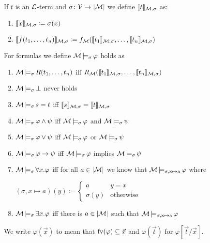 \begin{boxdef}
\begin{defi}
    If $t$ is an $\mathcal{L}$-term and $\sigma \colon \mathcal{V} \to \lvert \mathcal{M} \rvert$ we define \alert{$\llbracket t \rrbracket_{\mathcal{M}, \sigma}$} as: 
    \begin{enumerate}
        \item $\llbracket x \rrbracket_{\mathcal{M}, \sigma} \coloneq \sigma(x)$
        \item $\llbracket f(t_1, \dots, t_n) \rrbracket_{\mathcal{M}, \sigma} \coloneq f_{\mathcal{M}}(\llbracket t_1 \rrbracket_{\mathcal{M}, \sigma}, \dots, \llbracket t_n \rrbracket_{\mathcal{M}, \sigma})$
    \end{enumerate}
    For formulas we define \alert{$\mathcal{M} \operatorname{\models_{\sigma}} \varphi$} holds as 
    \begin{enumerate}
        \item $\mathcal{M} \operatorname{\models_{\sigma}} R(t_1, \dots, t_n)$ iff $R_{\mathcal{M}}(\llbracket t_1 \rrbracket_{\mathcal{M}, \sigma}, \dots, \llbracket t_n \rrbracket_{\mathcal{M}, \sigma})$
        \item $\mathcal{M} \operatorname{\models_{\sigma}} \bot$ never holds
        \item $\mathcal{M} \operatorname{\models_{\sigma}} s = t$ iff $\llbracket s \rrbracket_{\mathcal{M}, \sigma} = \llbracket t \rrbracket_{\mathcal{M}, \sigma}$
        \item $\mathcal{M} \operatorname{\models_{\sigma}} \varphi \wedge \psi$ iff $\mathcal{M} \operatorname{\models_{\sigma}} \varphi$ and $\mathcal{M} \operatorname{\models_{\sigma}} \psi$
        \item $\mathcal{M} \operatorname{\models_{\sigma}} \varphi \lor \psi$ iff $\mathcal{M} \operatorname{\models_{\sigma}} \varphi$ or $\mathcal{M} \operatorname{\models_{\sigma}} \psi$
        \item $\mathcal{M} \operatorname{\models_{\sigma}} \varphi \to \psi$ iff $\mathcal{M} \operatorname{\models_{\sigma}} \varphi$ implies $\mathcal{M} \operatorname{\models_{\sigma}} \psi$
        \item $\mathcal{M} \operatorname{\models_{\sigma}} \forall x. \varphi$ iff for all $a \in \lvert \mathcal{M} \rvert$ we know that $\mathcal{M} \operatorname{\models_{\sigma, x \mapsto a}} \varphi$ where 
        
        $(\sigma, x \mapsto a)(y) \coloneq
        \begin{cases}
            a & y = x \\
            \sigma(y) & \text{otherwise}
        \end{cases}$
        \item $\mathcal{M} \operatorname{\models_{\sigma}} \exists x. \varphi$ iff there is $a \in \lvert \mathcal{M} \rvert$ such that $\mathcal{M} \operatorname{\models_{\sigma, x \mapsto a}} \varphi$
    \end{enumerate}
\end{defi}
\end{boxdef}

\begin{rem}
    We write \alert{$\varphi(\vec{x})$} to mean that $\text{fv}(\varphi) \subseteq \vec{x}$ and \alert{$\varphi(\vec{t})$} for $\varphi[\vec{t}/\vec{x}]$.
\end{rem}

